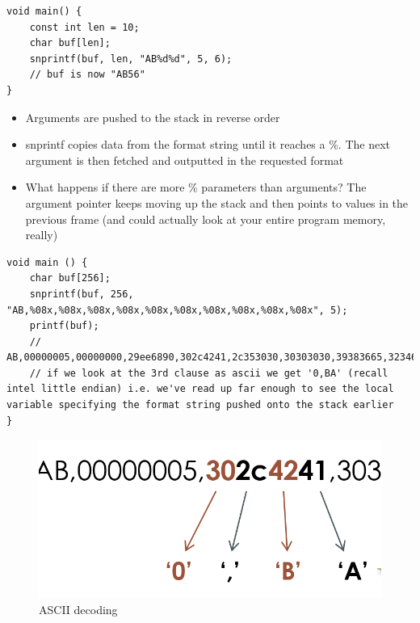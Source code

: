 \documentclass[../notes.tex]{subfiles}
\begin{document}
\begin{listing}[H]
\begin{verbatim}
void main() {
    const int len = 10;
    char buf[len];
    snprintf(buf, len, "AB%d%d", 5, 6);
    // buf is now "AB56"
}
\end{verbatim}
\end{listing}

\begin{itemize}
    \item Arguments are pushed to the stack in reverse order
    \item snprintf copies data from the format string until it reaches a \%. The next argument is then fetched and outputted in the requested format
    \item What happens if there are more \% parameters than arguments? The argument pointer keeps moving up the stack and then points to values in the previous frame (and could actually look at your entire program memory, really)
\end{itemize}

\begin{listing}[H]
\begin{verbatim}
void main () {
    char buf[256];
    snprintf(buf, 256, "AB,%08x,%08x,%08x,%08x,%08x,%08x,%08x,%08x,%08x,%08x", 5);
    printf(buf);
    // AB,00000005,00000000,29ee6890,302c4241,2c353030,30303030,39383665,32346332,33353363,30333033%                                                                                                                  
    // if we look at the 3rd clause as ascii we get '0,BA' (recall intel little endian) i.e. we've read up far enough to see the local variable specifying the format string pushed onto the stack earlier
}
\end{verbatim}
\end{listing}
\begin{figure}[H]
    \centering
    \includegraphics[width=0.8\linewidth]{img/image_2023-01-16-19-06-48.png}
    \caption{ASCII decoding}
\end{figure}
\end{document}
